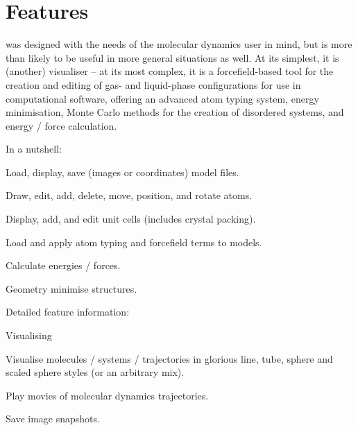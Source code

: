\chapter{Features}

\progname{} was designed with the needs of the molecular dynamics user in mind, but is more than likely to be useful in more general situations as well. At its simplest, it is (another) visualiser -- at its most complex, it is a forcefield-based tool for the creation and editing of gas- and liquid-phase configurations for use in computational software, offering an advanced atom typing system, energy minimisation, Monte Carlo methods for the creation of disordered systems, and energy / force calculation.\\

\begin{optlist}{In a nutshell:}
	\item Load, display, save (images or coordinates) model files.
	\item Draw, edit, add, delete, move, position, and rotate atoms.
	\item Display, add, and edit unit cells (includes crystal packing).
	\item Load and apply atom typing and forcefield terms to models.
	\item Calculate energies / forces.
	\item Geometry minimise structures.
\end{optlist}

Detailed feature information:\\

\begin{optlist}{Visualising}
	\item Visualise molecules / systems / trajectories in glorious line, tube, sphere and scaled sphere styles (or an arbitrary mix).
	\item Play movies of molecular dynamics trajectories.
	\item Save image snapshots.
\end{optlist}
